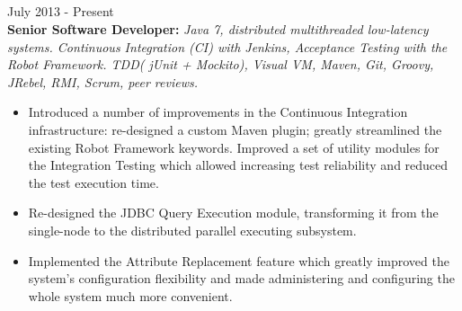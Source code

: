 \documentclass{res}
\begin{document}
\begin{resume}
\section{}
\vspace{8pt}
 \hfill        July 2013 - Present \\
{\bf Senior Software Developer:} {\em Java 7, distributed multithreaded low-latency systems. Continuous Integration (CI) with Jenkins, Acceptance Testing with the Robot Framework. TDD( jUnit + Mockito), Visual VM, Maven, Git, Groovy, JRebel, RMI, Scrum, peer reviews.}
\begin{itemize} \itemsep -2pt %
 \item Introduced a number of improvements in the Continuous Integration infrastructure: re-designed a custom Maven plugin; greatly streamlined the existing Robot Framework keywords. Improved a set of utility modules for the Integration Testing which allowed increasing test reliability and reduced the test execution time.
 \item Re-designed the JDBC Query Execution module, transforming it from the single-node to the distributed parallel executing subsystem.
 \item Implemented the Attribute Replacement feature which greatly improved the system’s configuration flexibility and made administering and configuring the whole system much more convenient.
 \end{itemize}


\end{resume}
\end{document}
